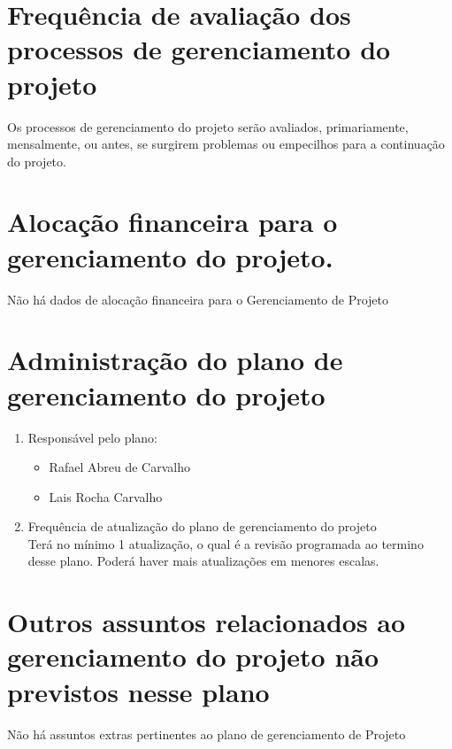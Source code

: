 \section*{Frequência de avaliação dos processos de gerenciamento do projeto}

Os processos de gerenciamento do projeto serão avaliados, primariamente, mensalmente, ou antes,
se surgirem problemas ou empecilhos para a continuação do projeto.

\section*{Alocação financeira para o gerenciamento do projeto.}

Não há dados de alocação financeira para o Gerenciamento de Projeto

\section*{Administração do plano de gerenciamento do projeto}
\begin{enumerate}
\item Responsável pelo plano:
\begin{itemize}
\item Rafael Abreu de Carvalho
\item Lais Rocha Carvalho
\end{itemize}
\item Frequência de atualização do plano de gerenciamento do projeto\\
	Terá no mínimo 1 atualização, o qual é a revisão programada ao termino desse plano. Poderá haver mais atualizações em menores escalas.

\end{enumerate}

\section*{Outros assuntos relacionados ao gerenciamento do projeto não previstos nesse plano}
Não há assuntos extras pertinentes ao plano de gerenciamento de Projeto

